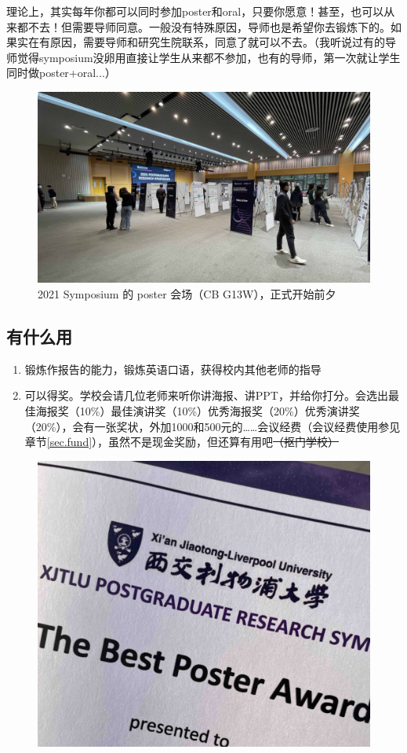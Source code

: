 理论上，其实每年你都可以同时参加poster和oral，只要你愿意！甚至，也可以从来都不去！但需要导师同意。一般没有特殊原因，导师也是希望你去锻炼下的。如果实在有原因，需要导师和研究生院联系，同意了就可以不去。（我听说过有的导师觉得symposium没卵用直接让学生从来都不参加，也有的导师，第一次就让学生同时做poster+oral...）

\begin{figure}[H]
    \caption{2021 Symposium 的 poster 会场（CB G13W），正式开始前夕}
    \centering
    \includegraphics[width=\columnwidth]{author-folder/Kai.Wu/synposium_poster.jpg}
\end{figure}

\subsection{有什么用}

\begin{enumerate}
    \item 锻炼作报告的能力，锻炼英语口语，获得校内其他老师的指导
    \item 可以得奖。学校会请几位老师来听你讲海报、讲PPT，并给你打分。会选出最佳海报奖（10\%）最佳演讲奖（10\%）优秀海报奖（20\%）优秀演讲奖（20\%），会有一张奖状，外加1000和500元的……会议经费（会议经费使用参见章节\ref{sec.fund}），虽然不是现金奖励，但还算有用吧\sout{（抠门学校）}
\end{enumerate}

\begin{figure}[H]
    \centering
    \includegraphics[width=0.4\columnwidth]{author-folder/Kai.Wu/poster_award.jpg}
\end{figure}

